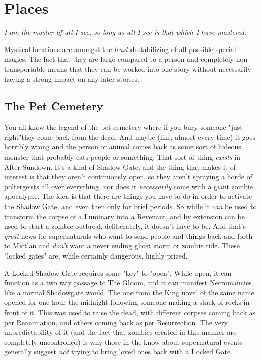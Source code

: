 \section{Places}
\textit{I am the master of all I see, so long as all I see is that which I have mastered.}

Mystical locations are amongst the \textit{least} destabilizing of all possible special magics. The fact that they are large compared to a person and completely non-transportable means that they can be worked into one story without necessarily having a strong impact on any later stories.

\subsection{The Pet Cemetery}
\hspace{\parindent} You all know the legend of the pet cemetery where if you bury someone "just right"they come back from the dead. And maybe (like, almost every time) it goes horribly wrong and the person or animal comes back as some sort of hideous monster that probably eats people or something. That sort of thing \textit{exists} in After Sundown. It's a kind of Shadow Gate, and the thing that makes it of interest is that they aren't continuously open, so they aren't spraying a horde of poltergeists all over everything, nor does it \textit{necessarily} come with a giant zombie apocalypse. The idea is that there are things you have to do in order to activate the Shadow Gate, and even then only for brief periods. So while it \textit{can} be used to transform the corpse of a Luminary into a Revenant, and by extension can be used to start a zombie outbreak deliberately, it doesn't have to be. And that's \textit{great} news for supernaturals who want to send people and things back and forth to Mictlan and \textit{don't} want a never ending ghost storm or zombie tide. These "locked gates" are, while certainly dangerous, highly prized.

A Locked Shadow Gate requires some "key" to "open". While open, it can function as a two way passage to The Gloom, and it can manifest Necromancies like a normal Shadowgate would. The one from the King novel of the same name opened for one hour the midnight following someone making a stack of rocks in front of it. This was used to raise the dead, with different corpses coming back as per Reanimation, and others coming back as per Resurrection. The very unpredictability of it (and the fact that zombies created in this manner are completely uncontrolled) is why those in the know about supernatural events generally suggest \textit{not} trying to bring loved ones back with a Locked Gate.

